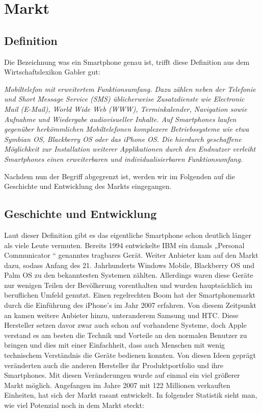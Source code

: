 
\chapter{Markt}

\section{Definition}

Die Bezeichnung was ein Smartphone genau ist, trifft diese Definition aus dem Wirtschaftslexikon Gabler gut:

\textit{Mobiltelefon mit erweitertem Funktionsumfang. Dazu zählen neben der Telefonie und Short Message Service (SMS) üblicherweise Zusatzdienste wie Electronic Mail (E-Mail), World Wide Web (WWW), Terminkalender, Navigation sowie Aufnahme und Wiedergabe audiovisueller Inhalte. Auf Smartphones laufen gegenüber herkömmlichen Mobiltelefonen komplexere Betriebssysteme wie etwa Symbian OS, Blackberry OS oder das iPhone OS. Die hierdurch geschaffene Möglichkeit zur Installation weiterer Applikationen durch den Endnutzer verleiht Smartphones einen erweiterbaren und individualisierbaren Funktionsumfang.}

Nachdem nun der Begriff abgegrenzt ist, werden wir im Folgenden auf die Geschichte und Entwicklung des Markts eingegangen.


\section{Geschichte und Entwicklung}

Laut dieser Definition gibt es das eigentliche Smartphone schon deutlich länger als viele Leute vermuten. Bereits 1994 entwickelte IBM ein damals „Personal Communicator “ genanntes tragbares Gerät. Weiter Anbieter kam auf den Markt dazu, sodass Anfang des 21. Jahrhunderts Windows Mobile, Blackberry OS und Palm OS zu den bekanntesten Systemen zählten. Allerdings waren diese Geräte nur wenigen Teilen der Bevölkerung vorenthalten  und wurden hauptsächlich im beruflichen Umfeld genutzt. Einen regelrechten Boom hat der Smartphonemarkt durch die Einführung des iPhone’s im Jahr 2007 erfahren. Von diesem Zeitpunkt an kamen weitere Anbieter hinzu, unteranderem Samsung und HTC. Diese Hersteller setzen davor zwar auch schon auf vorhandene Systeme, doch Apple verstand es am besten die Technik und Vorteile an den normalen Benutzer zu bringen und dies mit einer Einfachheit, dass auch Menschen mit wenig technischem Verständnis die Geräte bedienen konnten. Von diesen Ideen geprägt veränderten auch die anderen Hersteller ihr Produktportfolio und ihre Smartphones. Mit diesen Veränderungen wurde auf einmal ein viel größerer Markt möglich. Angefangen im Jahre 2007 mit 122 Millionen verkauften Einheiten, hat sich der Markt rasant entwickelt. In folgender Statistik sieht man, wie viel Potenzial noch in dem Markt steckt: 

